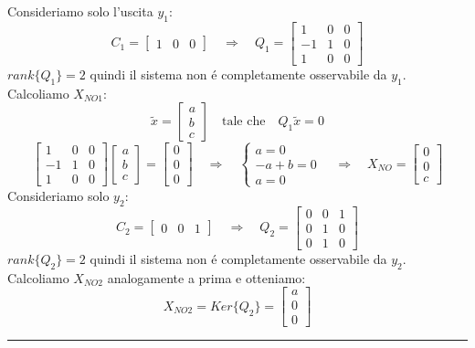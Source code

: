 \documentclass[../main.tex]{subfiles}
\begin{document}
\begin{Exercise}[title={Calcolare $ X_{NO} $}, difficulty=1]
			Consideriamo solo l'uscita $ y_1 $:
			\[
				C_1 =
				\begin{bmatrix}
					1 & 0 & 0
				\end{bmatrix}
				\quad\Rightarrow\quad
				Q_1 =
				\begin{bmatrix}
					1 & 0 & 0\\
					-1 & 1 & 0\\
					1 & 0 & 0
				\end{bmatrix}
			\] 
			$ rank\{Q_1\} = 2 $ quindi il sistema non \'e completamente osservabile da $ y_1 $. Calcoliamo $ X_{NO1} $:
			\[
				\tilde x =
				\begin{bmatrix}
					a\\
					b\\
					c
				\end{bmatrix}
				\quad\text{tale che}\quad
				Q_1 \tilde x = 0
			\]
			\[
				\begin{bmatrix}
					1 & 0 & 0\\
					-1 & 1 & 0\\
					1 & 0 & 0
				\end{bmatrix}
				\begin{bmatrix}
					a\\
					b\\
					c
				\end{bmatrix} =
				\begin{bmatrix}
					0\\
					0\\
					0
				\end{bmatrix}
				\quad\Rightarrow\quad
				\begin{cases}
					a = 0\\
					-a+b = 0\\
					a = 0
				\end{cases}
				\quad\Rightarrow\quad X_{NO} =
				\begin{bmatrix}
					0\\
					0\\
					c
				\end{bmatrix}
			\]
			Consideriamo solo $ y_2 $:
			\[
				C_2 =
				\begin{bmatrix}
					0 & 0 & 1
				\end{bmatrix}
				\quad\Rightarrow\quad
				Q_2 =
				\begin{bmatrix}
					0 & 0 & 1\\
					0 & 1 & 0\\
					0 & 1 & 0
				\end{bmatrix}
			\] 
			$ rank\{Q_2\} = 2 $ quindi il sistema non \'e completamente osservabile da $ y_2 $. Calcoliamo $ X_{NO2} $ analogamente a prima e otteniamo:
			\[
				X_{NO2} = Ker\{Q_2\} =
				\begin{bmatrix}
					a\\
					0\\
					0
				\end{bmatrix}
			\]
			\hrule
		\end{Exercise}
	
\end{document}
